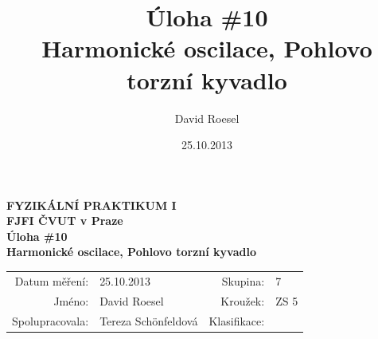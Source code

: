 \documentclass[english]{article}
\newcommand{\Author}{David Roesel}
\newcommand{\Coauthor}{Tereza Schönfeldová}
\newcommand{\Institute}{FJFI ČVUT v Praze}
\newcommand{\Subject}{FYZIKÁLNÍ PRAKTIKUM I}
\newcommand{\Group}{7}
\newcommand{\Circle}{ZS 5}
\newcommand{\Title}{Úloha \#10 \\Harmonické oscilace, Pohlovo torzní kyvadlo}
\newcommand{\Date}{25.10.2013}
\begin{document}
\author{\Author}
\title{\Title}
\date{\Date}

\renewcommand{\figurename}{Obr.}
\renewcommand{\tablename}{Tab.}
\renewcommand{\refname}{Reference}


\setlength{\parindent}{0cm}
\begin{multicols}{2}
\textbf{\Subject \\
        \Institute \\[0.1cm]
\Title \\[0.5cm]
}
\begin{tabular}{rlrl}
\large Datum měření: & \Date & \large Skupina: & \Group \\
\large Jméno: & \Author & \large Kroužek:  & \Circle\\
\large Spolupracovala: & \Coauthor &\large Klasifikace:\\
\end{tabular}


\end{multicols}
\end{document}
